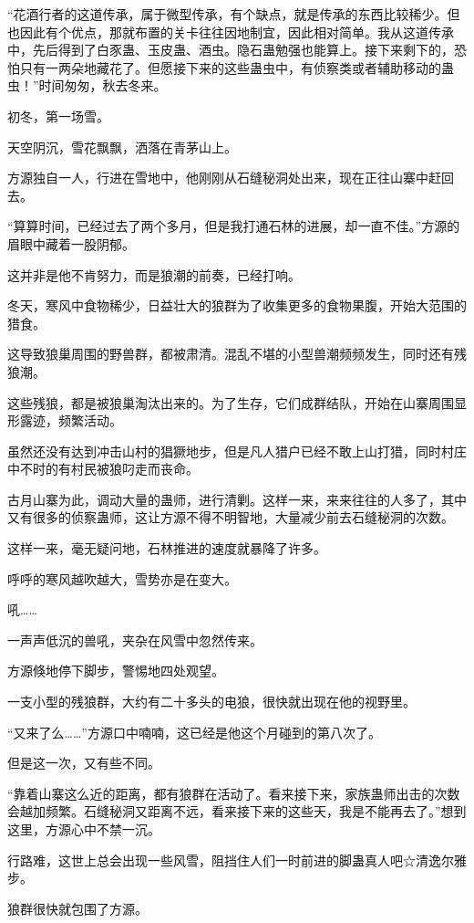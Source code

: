\begin{this_body}
“花酒行者的这道传承，属于微型传承，有个缺点，就是传承的东西比较稀少。但也因此有个优点，那就布置的关卡往往因地制宜，因此相对简单。我从这道传承中，先后得到了白豕蛊、玉皮蛊、酒虫。隐石蛊勉强也能算上。接下来剩下的，恐怕只有一两朵地藏花了。但愿接下来的这些蛊虫中，有侦察类或者辅助移动的蛊虫！”时间匆匆，秋去冬来。

初冬，第一场雪。

天空阴沉，雪花飘飘，洒落在青茅山上。

方源独自一人，行进在雪地中，他刚刚从石缝秘洞处出来，现在正往山寨中赶回去。

“算算时间，已经过去了两个多月，但是我打通石林的进展，却一直不佳。”方源的眉眼中藏着一股阴郁。

这并非是他不肯努力，而是狼潮的前奏，已经打响。

冬天，寒风中食物稀少，日益壮大的狼群为了收集更多的食物果腹，开始大范围的猎食。

这导致狼巢周围的野兽群，都被肃清。混乱不堪的小型兽潮频频发生，同时还有残狼潮。

这些残狼，都是被狼巢淘汰出来的。为了生存，它们成群结队，开始在山寨周围显形露迹，频繁活动。

虽然还没有达到冲击山村的猖獗地步，但是凡人猎户已经不敢上山打猎，同时村庄中不时的有村民被狼叼走而丧命。

古月山寨为此，调动大量的蛊师，进行清剿。这样一来，来来往往的人多了，其中又有很多的侦察蛊师，这让方源不得不明智地，大量减少前去石缝秘洞的次数。

这样一来，毫无疑问地，石林推进的速度就暴降了许多。

呼呼的寒风越吹越大，雪势亦是在变大。

吼……

一声声低沉的兽吼，夹杂在风雪中忽然传来。

方源倏地停下脚步，警惕地四处观望。

一支小型的残狼群，大约有二十多头的电狼，很快就出现在他的视野里。

“又来了么……”方源口中喃喃，这已经是他这个月碰到的第八次了。

但是这一次，又有些不同。

“靠着山寨这么近的距离，都有狼群在活动了。看来接下来，家族蛊师出击的次数会越加频繁。石缝秘洞又距离不远，看来接下来的这些天，我是不能再去了。”想到这里，方源心中不禁一沉。

行路难，这世上总会出现一些风雪，阻挡住人们一时前进的脚蛊真人吧☆清逸尔雅步。

狼群很快就包围了方源。


\end{this_body}

